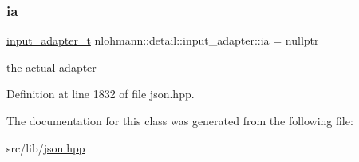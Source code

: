 \subsubsection{\texorpdfstring{ia}{ia}}
{\footnotesize\ttfamily \hyperlink{namespacenlohmann_1_1detail_ae132f8cd5bb24c5e9b40ad0eafedf1c2}{input\+\_\+adapter\+\_\+t} nlohmann\+::detail\+::input\+\_\+adapter\+::ia = nullptr\hspace{0.3cm}{\ttfamily [private]}}



the actual adapter 



Definition at line 1832 of file json.\+hpp.



The documentation for this class was generated from the following file\+:\begin{DoxyCompactItemize}
\item 
src/lib/\hyperlink{json_8hpp}{json.\+hpp}\end{DoxyCompactItemize}
